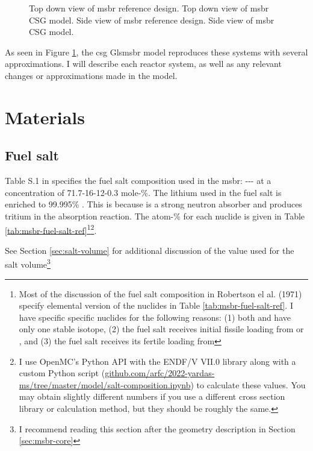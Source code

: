 \begin{figure}[htpb]
{        \label{fig:msbr-model-xz}
    }
    \caption[Full views of MSBR]{
         Top down view of \Gls{msbr} reference design.
         Top down view of \Gls{msbr} CSG model.
         Side view of \Gls{msbr} reference design.
         Side view of \Gls{msbr} CSG model.
    }
    \label{fig:msbr-overview}
\end{figure}

As seen in Figure \ref{fig:msbr-overview}, the \Gls{csg} Gls{msbr}
model reproduces these systems with several approximations. I will
describe each reactor system, as well as any relevant changes or
approximations made in the model.

\section{Materials}
\label{sec:msbr-materials}

\subsection{Fuel salt}
\label{sub:msbr-fuel-salt}
Table S.1 in \cite{robertson_conceptual_1971} specifies the fuel salt
composition used in the \Gls{msbr}:
--- at a concentration of
71.7-16-12-0.3 mole-\%. The lithium used in the fuel salt is enriched to
99.995\% . This is because  is a strong neutron absorber
and produces tritium in the absorption reaction. The atom-\% for each nuclide is
given in Table \ref{tab:msbr-fuel-salt-ref}\footnote{Most of the discussion of
the fuel salt composition in Robertson el al. (1971)
\cite{robertson_conceptual_1971}
specify elemental version of the nuclides in Table \ref{tab:msbr-fuel-salt-ref}.
I have specific specific nuclides for the following reasons: (1) both  and
 have only one stable isotope, (2) the fuel salt receives initial fissile
loading from  or , and (3) the fuel salt receives its
fertile loading from }\footnote{I use OpenMC's Python API with the
ENDF/V VII.0 library along with a custom Python script
(\url{github.com/arfc/2022-yardas-ms/tree/master/model/salt-composition.ipynb})
to calculate these values. You may obtain slightly different numbers if you use
a different cross section library or calculation method, but they should  be
roughly the same.}.

See Section \ref{sec:salt-volume} for additional discussion of the value used
for the salt volume\footnote{I recommend reading this section after the geometry
description in Section \ref{sec:msbr-core}}

